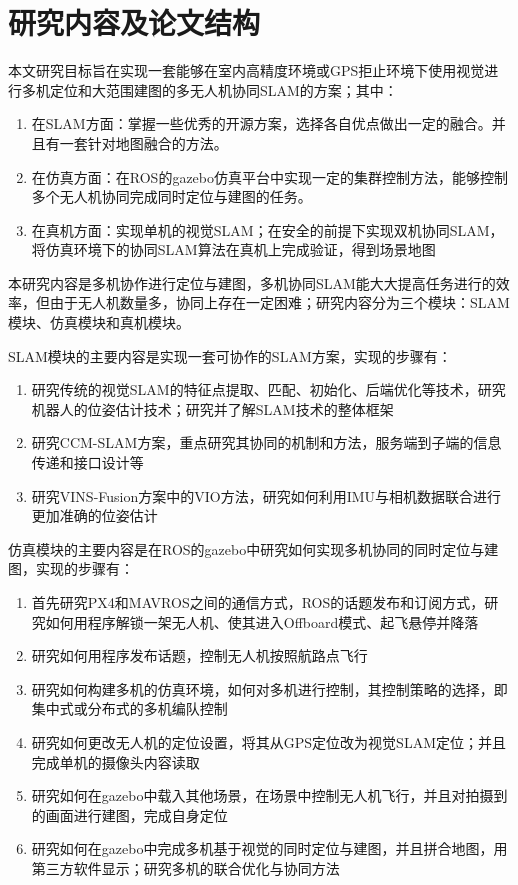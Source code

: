 \section{研究内容及论文结构}
本文研究目标旨在实现一套能够在室内高精度环境或GPS拒止环境下使用视觉进行多机定位和大范围建图的多无人机协同SLAM的方案；其中：

\begin{enumerate}
	\item 在SLAM方面：掌握一些优秀的开源方案，选择各自优点做出一定的融合。并且有一套针对地图融合的方法。
	\item 在仿真方面：在ROS的gazebo仿真平台中实现一定的集群控制方法，能够控制多个无人机协同完成同时定位与建图的任务。
	\item 在真机方面：实现单机的视觉SLAM；在安全的前提下实现双机协同SLAM，将仿真环境下的协同SLAM算法在真机上完成验证，得到场景地图
\end{enumerate}

本研究内容是多机协作进行定位与建图，多机协同SLAM能大大提高任务进行的效率，但由于无人机数量多，协同上存在一定困难；研究内容分为三个模块：SLAM模块、仿真模块和真机模块。

SLAM模块的主要内容是实现一套可协作的SLAM方案，实现的步骤有：

\begin{enumerate}
	\item 研究传统的视觉SLAM的特征点提取、匹配、初始化、后端优化等技术，研究机器人的位姿估计技术；研究并了解SLAM技术的整体框架
	\item 研究CCM-SLAM方案，重点研究其协同的机制和方法，服务端到子端的信息传递和接口设计等
	\item 研究VINS-Fusion方案中的VIO方法，研究如何利用IMU与相机数据联合进行更加准确的位姿估计
\end{enumerate}

仿真模块的主要内容是在ROS的gazebo中研究如何实现多机协同的同时定位与建图，实现的步骤有：

\begin{enumerate}
	\item 首先研究PX4和MAVROS之间的通信方式，ROS的话题发布和订阅方式，研究如何用程序解锁一架无人机、使其进入Offboard模式、起飞悬停并降落
	\item 研究如何用程序发布话题，控制无人机按照航路点飞行
	\item 研究如何构建多机的仿真环境，如何对多机进行控制，其控制策略的选择，即集中式或分布式的多机编队控制
	\item 研究如何更改无人机的定位设置，将其从GPS定位改为视觉SLAM定位；并且完成单机的摄像头内容读取
	\item 研究如何在gazebo中载入其他场景，在场景中控制无人机飞行，并且对拍摄到的画面进行建图，完成自身定位
	\item 研究如何在gazebo中完成多机基于视觉的同时定位与建图，并且拼合地图，用第三方软件显示；研究多机的联合优化与协同方法
\end{enumerate}

